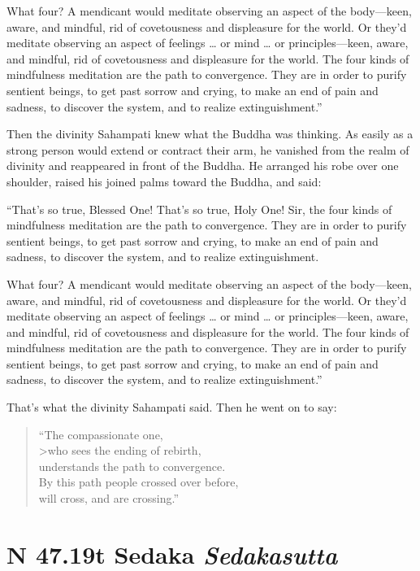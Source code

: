 \documentclass[12pt,openany]{book}%
\newcommand*{\suttatitleacronym}[1]{\smaller[2]{#1}\vspace*{.3em}}
\newcommand*{\suttatitletranslation}[1]{\linebreak{#1}}
\newcommand*{\suttatitleroot}[1]{\linebreak\smaller[2]\itshape{#1}}
\newcommand*{\tocacronym}[1]{\hspace*{-3.3em}{#1}\quad}
\newcommand*{\toctranslation}[1]{#1}
\newcommand*{\tocroot}[1]{(\textit{#1})}
\begin{document}
What four? A mendicant would meditate observing an aspect of the body—keen, aware, and mindful, rid of covetousness and displeasure for the world. Or they’d meditate observing an aspect of feelings … or mind … or principles—keen, aware, and mindful, rid of covetousness and displeasure for the world. The four kinds of mindfulness meditation are the path to convergence. They are in order to purify sentient beings, to get past sorrow and crying, to make an end of pain and sadness, to discover the system, and to realize extinguishment.” 

Then the divinity Sahampati knew what the Buddha was thinking. As easily as a strong person would extend or contract their arm, he vanished from the realm of divinity and reappeared in front of the Buddha. He arranged his robe over one shoulder, raised his joined palms toward the Buddha, and said: 

“That’s so true, Blessed One! That’s so true, Holy One! Sir, the four kinds of mindfulness meditation are the path to convergence. They are in order to purify sentient beings, to get past sorrow and crying, to make an end of pain and sadness, to discover the system, and to realize extinguishment. 

What four? A mendicant would meditate observing an aspect of the body—keen, aware, and mindful, rid of covetousness and displeasure for the world. Or they’d meditate observing an aspect of feelings … or mind … or principles—keen, aware, and mindful, rid of covetousness and displeasure for the world. The four kinds of mindfulness meditation are the path to convergence. They are in order to purify sentient beings, to get past sorrow and crying, to make an end of pain and sadness, to discover the system, and to realize extinguishment.” 

That’s what the divinity Sahampati said. Then he went on to say: 

\begin{verse}%
“The compassionate one, \\>who sees the ending of rebirth, \\
understands the path to convergence. \\
By this path people crossed over before, \\
will cross, and are crossing.” 

%
\end{verse}

%
\section*{{\suttatitleacronym SN 47.19}{\suttatitletranslation At Sedaka }{\suttatitleroot Sedakasutta}}
\addcontentsline{toc}{section}{\tocacronym{SN 47.19} \toctranslation{At Sedaka } \tocroot{Sedakasutta}}
\end{document}

